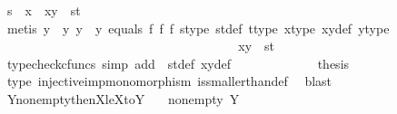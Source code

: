 \begin{isabellebody}
\ {\isachardoublequoteopen}s\ {\isasymnoteq}\ x\ {\isasymLongrightarrow}\ {\isasymlangle}x{\isacharcomma}{\kern0pt}y{\isasymrangle}\ {\isacharequal}{\kern0pt}\ {\isasymlangle}s{\isacharcomma}{\kern0pt}t{\isasymrangle}{\isachardoublequoteclose}\isanewline
\ \ \ \ \ \ \ \ \ \ \ \ \ \ \ \isamarkupfalse%
\ {\isacharparenleft}{\kern0pt}metis\ {\isacartoucheopen}y\ {\isasymnoteq}\ y{}{\isacartoucheclose}\ {\isacartoucheopen}y\ {\isasymnoteq}\ y{}{\isacartoucheclose}\ equals\ f{}\ f{}\ f{}\ s{\isacharunderscore}{\kern0pt}type\ st{\isacharunderscore}{\kern0pt}def\ t{\isacharunderscore}{\kern0pt}type\ x{\isacharunderscore}{\kern0pt}type\ xy{\isacharunderscore}{\kern0pt}def\ y{\isacharunderscore}{\kern0pt}type{\isacharparenright}{\kern0pt}\isanewline
\ \ \ \ \ \ \ \ \ \ \ \isamarkupfalse%
\isanewline
\ \ \ \ \ \ \ \ \ \isamarkupfalse%
\isanewline
\ \ \ \ \ \ \ \isamarkupfalse%
\isanewline
\ \ \ \ \ \isamarkupfalse%
\ \isamarkupfalse%
\ {\isachardoublequoteopen}xy\ {\isacharequal}{\kern0pt}\ st{\isachardoublequoteclose}\isanewline
\ \ \ \ \ \ \ \isamarkupfalse%
\ {\isacharparenleft}{\kern0pt}typecheck{\isacharunderscore}{\kern0pt}cfuncs{\isacharcomma}{\kern0pt}\ simp\ add{\isacharcolon}{\kern0pt}\ \ st{\isacharunderscore}{\kern0pt}def\ xy{\isacharunderscore}{\kern0pt}def{\isacharparenright}{\kern0pt}\isanewline
\ \ \ \isamarkupfalse%
\isanewline
\ \ \ \ \ \ \isamarkupfalse%
\ \isamarkupfalse%
\ {\isacharquery}{\kern0pt}thesis\isanewline
\ \ \ \ \ \ \ \ \isamarkupfalse%
\ {\isasymTheta}{\isacharunderscore}{\kern0pt}type\ injective{\isacharunderscore}{\kern0pt}imp{\isacharunderscore}{\kern0pt}monomorphism\ is{\isacharunderscore}{\kern0pt}smaller{\isacharunderscore}{\kern0pt}than{\isacharunderscore}{\kern0pt}def\ \isamarkupfalse%
\ blast\isanewline
\ \ \ \ \isamarkupfalse%
\isanewline
\ \ \isamarkupfalse%
\ \ \isanewline
\ \isamarkupfalse%
\isanewline
{}\isamarkupfalse%
%
\endisatagproof
{\isafoldproof}%
%
\isadelimproof
\isanewline
%
\endisadelimproof
\isanewline
{}\isamarkupfalse%
\ Y{\isacharunderscore}{\kern0pt}nonempty{\isacharunderscore}{\kern0pt}then{\isacharunderscore}{\kern0pt}X{\isacharunderscore}{\kern0pt}le{\isacharunderscore}{\kern0pt}XtoY{\isacharcolon}{\kern0pt}\isanewline
\ \ \ {\isachardoublequoteopen}nonempty\ Y{\isachardoublequoteclose}\isanewline

\end{isabellebody}
